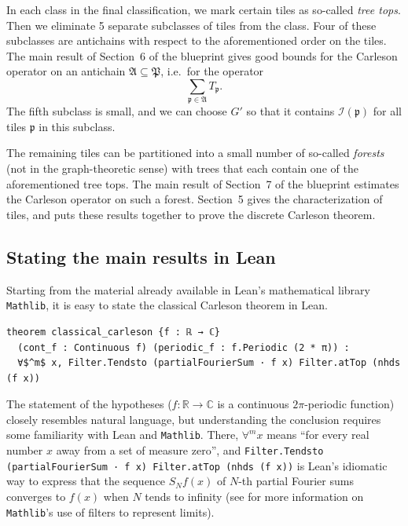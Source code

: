 \documentclass[12pt]{amsart}
\newcounter{lstlisting}[section]
\newcommand{\lean}[1]{\lstinline{#1}}
\newcommand*{\complex}{\mathbb{C}} %
\newcommand*{\real}{\mathbb{R}} %
\newcommand{\mathlib}{\texttt{Mathlib}\xspace}
\theoremstyle{definition}
\theoremstyle{plain}
\newcommand{\scI}{{\mathcal{I}}} %
\newcommand{\fp}{{\mathfrak p}}
\newcommand{\fP}{{\mathfrak P}}
\begin{document}
In each class in the final classification, we mark certain tiles as so-called \emph{tree tops}.
Then we eliminate 5 separate subclasses of tiles from the class.
Four of these subclasses are antichains with respect to the aforementioned order on the tiles.
The main result of Section~6 of the blueprint gives good bounds for the
Carleson operator on an antichain $\mathfrak{A}\subseteq\fP$, i.e.\ for the operator
$$\sum_{\fp\in\mathfrak{A}}T_{\fp}.$$
The fifth subclass is small, and we can choose $G'$
so that it contains $\scI(\fp)$ for all tiles $\fp$ in this subclass.

The remaining tiles can be partitioned into a small number of so-called \emph{forests}
(not in the graph-theoretic sense)
with trees that each contain one of the aforementioned tree tops.
The main result of Section~7 of the blueprint estimates the Carleson operator on such a forest.
Section~5 gives the characterization of tiles,
and puts these results together to prove the discrete Carleson theorem.

\subsection{Stating the main results in Lean}\label{subsec:lean-statements}

Starting from the material already available in Lean's mathematical library \mathlib, it is easy to state the classical Carleson theorem in Lean.
\begin{lstlisting}[mathescape]
theorem classical_carleson {f : ℝ → ℂ}
  (cont_f : Continuous f) (periodic_f : f.Periodic (2 * π)) :
  ∀$^m$ x, Filter.Tendsto (partialFourierSum · f x) Filter.atTop (nhds (f x))
\end{lstlisting}

The statement of the hypotheses ($f \colon \real \to \complex$ is a continuous $2\pi$-periodic function) closely resembles natural language, but understanding the conclusion requires some familiarity with Lean and \mathlib. There, $\forall^m x$ means ``for every real number $x$ away from a set of measure zero'', and
\lean{Filter.Tendsto (partialFourierSum · f x) Filter.atTop (nhds (f x))} is Lean's idiomatic way to express that the sequence $S_N f(x)$ of $N$-th partial Fourier sums converges to $f(x)$ when $N$ tends to infinity (see \cite[\S11.1]{mathematics_in_lean} for more information on \mathlib's use of filters to represent limits).
\end{document}
